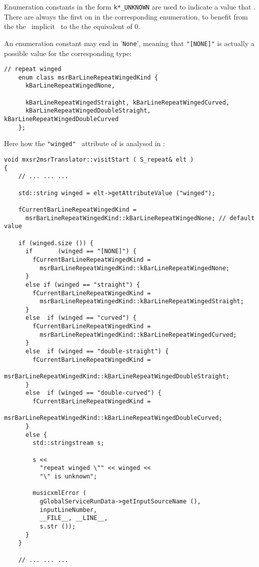 Enumeration constants in the form {\tt k*_UNKNOWN} are used to indicate a value that . There are always the first on in the corresponding enumeration, to benefit from the the \CPlusplus\ implicit \initialization\  to the the equivalent of 0.

An enumeration constant may end in '{\tt None}', meaning that {\tt "[NONE]"} is actually a possible value for the corresponding type:
\begin{lstlisting}[language=CPlusPlus]
    // repeat winged
    enum class msrBarLineRepeatWingedKind {
      kBarLineRepeatWingedNone,

      kBarLineRepeatWingedStraight, kBarLineRepeatWingedCurved,
      kBarLineRepeatWingedDoubleStraight, kBarLineRepeatWingedDoubleCurved
    };
\end{lstlisting}

Here how the {\tt "winged"} \mxml\ attribute of  is analysed in {\tt }:%
\begin{lstlisting}[language=CPlusPlus]
void mxsr2msrTranslator::visitStart ( S_repeat& elt )
{
    // ... ... ...

    std::string winged = elt->getAttributeValue ("winged");

    fCurrentBarLineRepeatWingedKind =
      msrBarLineRepeatWingedKind::kBarLineRepeatWingedNone; // default value

    if (winged.size ()) {
      if       (winged == "[NONE]") {
        fCurrentBarLineRepeatWingedKind =
          msrBarLineRepeatWingedKind::kBarLineRepeatWingedNone;
      }
      else if (winged == "straight") {
        fCurrentBarLineRepeatWingedKind =
          msrBarLineRepeatWingedKind::kBarLineRepeatWingedStraight;
      }
      else  if (winged == "curved") {
        fCurrentBarLineRepeatWingedKind =
          msrBarLineRepeatWingedKind::kBarLineRepeatWingedCurved;
      }
      else  if (winged == "double-straight") {
        fCurrentBarLineRepeatWingedKind =
          msrBarLineRepeatWingedKind::kBarLineRepeatWingedDoubleStraight;
      }
      else  if (winged == "double-curved") {
        fCurrentBarLineRepeatWingedKind =
          msrBarLineRepeatWingedKind::kBarLineRepeatWingedDoubleCurved;
      }
      else {
        std::stringstream s;

        s <<
          "repeat winged \"" << winged <<
          "\" is unknown";

        musicxmlError (
          gGlobalServiceRunData->getInputSourceName (),
          inputLineNumber,
          __FILE__, __LINE__,
          s.str ());
      }
    }

    // ... ... ...
\end{lstlisting}


